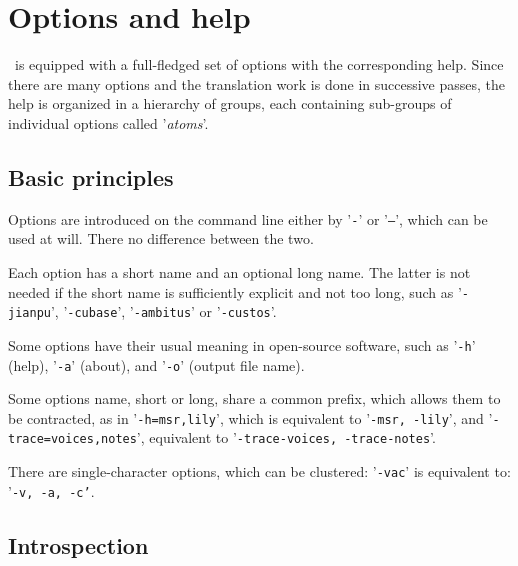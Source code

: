 \documentclass[12pt,a4paper]{article}
\begin{document}
\section{Options and help}

\xmlToLy\ is equipped with a full-fledged set of options with the corresponding help. Since there are many options and the translation work is done in successive passes, the help is organized in a hierarchy of groups, each containing sub-groups of individual options called '{\it atoms}'.

\subsection{Basic principles}

Options are introduced on the command line either by '{\tt -}' or '{\tt --}', which can be used at will. There no difference between the two.

Each option has a short name and an optional long name. The latter is not needed if the short name is sufficiently explicit and not too long, such as '{\tt -jianpu}', '{\tt -cubase}', '{\tt -ambitus}' or '{\tt -custos}'.

Some options have their usual meaning in open-source software, such as '{\tt -h}' (help), '{\tt -a}' (about), and '{\tt -o}' (output file name).

Some options name, short or long, share a common prefix, which allows them to be contracted, as in '{\tt -h=msr,lily}', which is equivalent to '{\tt -msr, -lily}', and '{\tt -trace=voices,notes}', equivalent to '{\tt -trace-voices, -trace-notes}'.

There are single-character options, which can be clustered: '{\tt -vac}' is equivalent to: '{\tt -v, -a, -c'}.

\subsection{Introspection}
\end{document}
